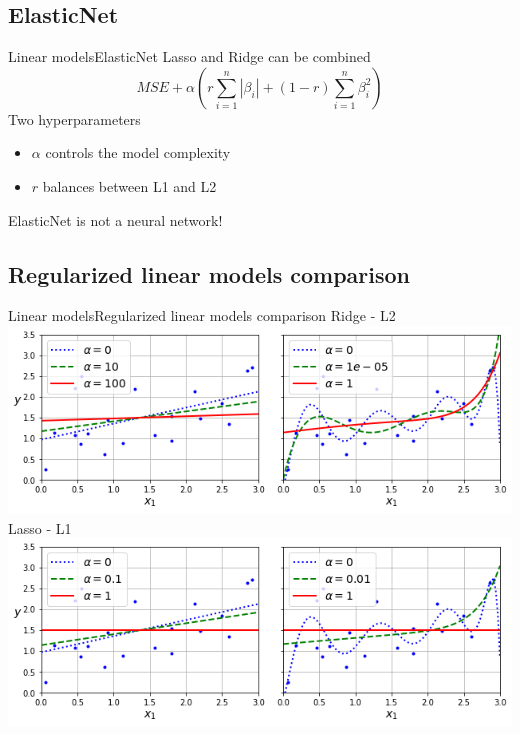 \documentclass[10pt,compress]{beamer} %
\begin{document}
\subsection{ElasticNet}
\begin{frame}{Linear models}{ElasticNet}
	Lasso and Ridge can be combined
    \begin{equation*}
        MSE + \alpha \left( r \sum_{i=1}^n |\beta_i| + (1-r) \sum_{i=1}^n \beta_i^2 \right)
    \end{equation*}
    Two hyperparameters
	\begin{itemize}
        \item $\alpha$ controls the model complexity
		\item $r$ balances between L1 and L2
	\end{itemize}
    ElasticNet is not a neural network!
\end{frame}

\subsection{Regularized linear models comparison}
\begin{frame}{Linear models}{Regularized linear models comparison}
    \centering
    Ridge - L2\\
    \centering \includegraphics[width=0.7\linewidth]{figs/ridge.png}\\
    Lasso - L1\\
    \centering \includegraphics[width=0.7\linewidth]{figs/lasso.png}
\end{frame}
\end{document}
